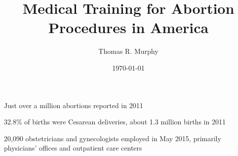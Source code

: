 \documentclass[letterpaper, 12pt]{article}
\title{Medical Training for Abortion Procedures in America}
\author{Thomas R. Murphy}
\date{\today}
\begin{document}
\maketitle


Just over a million abortions reported in 2011 \autocite[pg. 7]{jones_abortion_2014}

32.8\% of births were Cesarean deliveries, about 1.3 million births in 2011 \autocite[pg. 5.]{martin_births_2013}

20,090 obstetricians and gynecologists employed in May 2015, primarily physicians' offices and outpatient care centers \autocite{occupational_employment_and_wages_may_2015}


\autocite{accreditation_council_for_graduate_medical_education_acgme_2014}

\autocite{freedman_obstacles_2010}

\autocite{bennett_early_2009}



\newpage
\printbibliography
\end{document}
